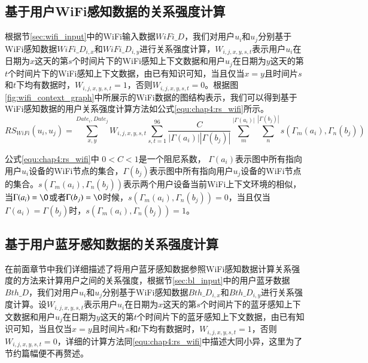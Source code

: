 \subsection{基于用户WiFi感知数据的关系强度计算}
\label{wifi_caclulate}
根据节\ref{sec:wifi_input}中的WiFi输入数据$WiFi\_D$，我们对用户$u_{i}$和$u_{j}$分别基于WiFi感知数据$WiFi\_D_{i,x}$和$WiFi\_D_{i,y}$进行关系强度计算，$W_{i,j,x,y,s,t}$表示用户$u_{i}$在日期为$x$这天的第$s$个时间片下的WiFi感知上下文数据和用户$u_{j}$在日期为$y$这天的第$t$个时间片下的WiFi感知上下文数据，由已有知识可知，当且仅当$x=y$且时间片$s$和$t$下均有数据时，$W_{i,j,x,y,s,t}=1$，否则$W_{i,j,x,y,s,t}=0$。根据图\ref{fig:wifi_context_graph}中所展示的WiFi数据的图结构表示，我们可以得到基于WiFi感知数据的用户关系强度计算方法如公式\ref{equ:chap4:rs_wifi}所示。
\begin{equation}
\label{equ:chap4:rs_wifi}
RS_{WiFi}(u_{i},u_{j})=\sum_{x ,y }^{ Date_{i}, Date_{j}}W_{i,j,x,y,s,t}\sum_{s,t=1}^{96} \frac{C}{ \left |\Gamma (a_{i})  \right |\left |\Gamma (b_{j})  \right | } \sum_{m}^{\left |\Gamma (a_{i})  \right |}  \sum_{n}^{\left |\Gamma (b_{j})  \right |}s(\Gamma_{m} (a_{i}),\Gamma_{n} (b_{j}))
\end{equation}
\par 公式\ref{equ:chap4:rs_wifi}中  $0< C<1$是一个阻尼系数， $\Gamma (a_{i}) $表示图中所有指向用户$u_{i}$设备的WiFi节点的集合，$\Gamma (b_{j}) $表示图中所有指向用户$u_{j}$设备的WiFi节点的集合。$s(\Gamma_{m} (a_{i}),\Gamma_{n} (b_{j}))$表示两个用户设备当前WiFi上下文环境的相似，当$\Gamma (a_{i})= \O$或者$\Gamma (b_{j})=\O$时候，$s(\Gamma_{m} (a_{i}),\Gamma_{n} (b_{j}))=0$，当且仅当$\Gamma (a_{i})=\Gamma (b_{j})$时，$s(\Gamma_{m} (a_{i}),\Gamma_{n} (b_{j}))=1$。
\subsection{基于用户蓝牙感知数据的关系强度计算}
\label{bth_caclulate}
在前面章节中我们详细描述了将用户蓝牙感知数据参照WiFi感知数据计算关系强度的方法来计算用户之间的关系强度，根据节\ref{sec:bl_input}中的用户蓝牙数据$Bth\_D$，我们对用户$u_{i}$和$u_{j}$分别基于WiFi感知数据$Bth\_D_{i,x}$和$Bth\_D_{i,y}$进行关系强度计算。设$W_{i,j,x,y,s,t}$表示用户$u_{i}$在日期为$x$这天的第$s$个时间片下的蓝牙感知上下文数据和用户$u_{j}$在日期为$y$这天的第$t$个时间片下的蓝牙感知上下文数据，由已有知识可知，当且仅当$x=y$且时间片$s$和$t$下均有数据时，$W_{i,j,x,y,s,t}=1$，否则$W_{i,j,x,y,s,t}=0$，详细的计算方法同\ref{equ:chap4:rs_wifi}中描述大同小异，这里为了节约篇幅便不再赘述。

